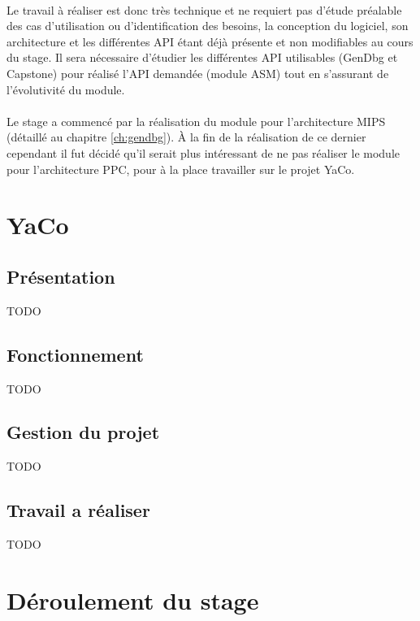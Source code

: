 \documentclass[11pt, book, english, french, standardlists]{upmethodology-document}
\begin{document}
				\paragraph{}
					Le travail à réaliser est donc très technique et ne requiert pas d'étude préalable des cas d'utilisation ou d'identification des besoins, la conception du logiciel, son architecture et les différentes \gls{API} étant déjà présente et non modifiables au cours du stage. Il sera nécessaire d'étudier les différentes \gls{API} utilisables (GenDbg et Capstone) pour réalisé l'\gls{API} demandée (module ASM) tout en s'assurant de l'évolutivité du module.
				\paragraph*{}
					Le stage a commencé par la réalisation du module pour l'architecture \acrshort{MIPS} (détaillé au chapitre \ref{ch:gendbg}). À la fin de la réalisation de ce dernier cependant il fut décidé qu'il serait plus intéressant de ne pas réaliser le module pour l'architecture \acrshort{PPC}, pour à la place travailler sur le projet YaCo. %
		\section{YaCo}
			\subsection{Présentation}
				TODO
			\subsection{Fonctionnement}
				TODO
			\subsection{Gestion du projet}
				TODO
			\subsection{Travail a réaliser}
				TODO
		\section{Déroulement du stage}
\end{document}
